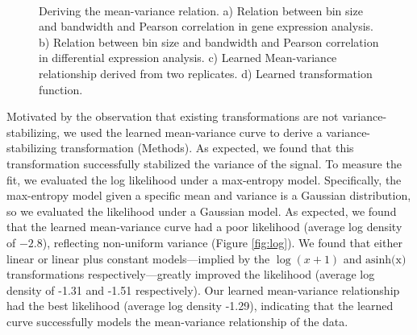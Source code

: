 \documentclass[11pt]{article}
\begin{document}
\begin{figure}[th!]
	~ %
	\caption{Deriving the mean-variance relation. a) Relation between bin size and bandwidth and Pearson correlation in gene expression analysis. b) Relation between bin size and bandwidth and Pearson correlation in differential expression analysis. c) Learned Mean-variance relationship derived from two replicates.  d) Learned transformation function.
	}
	\label{fig:meanvarvar}
\end{figure}

Motivated by the observation that existing transformations are not variance-stabilizing, we used the learned mean-variance curve to derive a variance-stabilizing transformation (Methods).
As expected, we found that this transformation successfully stabilized the variance of the signal. 
To measure the fit, we evaluated the log likelihood under a max-entropy model.
Specifically, the max-entropy model given a specific mean and variance is a Gaussian distribution, so we evaluated the likelihood under a Gaussian model.
As expected, we found that the learned mean-variance curve had a poor likelihood (average log density of $-2.8$), reflecting non-uniform variance (Figure \ref{fig:log}). 
We found that either linear or linear plus constant models---implied by the $\log(x+1)$ and $\text{asinh(x)}$ transformations respectively---greatly improved the likelihood (average log density of -1.31 and -1.51 respectively).
Our learned mean-variance relationship had the best likelihood (average log density -1.29), indicating that the learned curve successfully models the mean-variance relationship of the data. 
\end{document}

